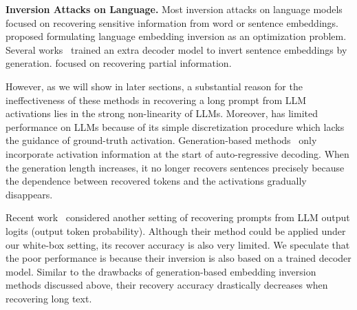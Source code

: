 \noindent \textbf{Inversion Attacks on Language.}
Most inversion attacks on language models focused on recovering sensitive information from word or sentence embeddings.  \cite{song2020information} proposed formulating language embedding inversion as an optimization problem. Several works~\cite{Sentence_inference_attack, Generative-embedding-inversion-attack} trained an extra decoder model to invert sentence embeddings by generation. \cite{pan2020privacy} focused on recovering partial information. 

However, as we will show in later sections, a substantial reason for the ineffectiveness of these methods in recovering a long prompt from LLM activations lies in the strong non-linearity of LLMs. Moreover, \cite{song2020information} has limited performance on LLMs because of its simple discretization procedure which lacks the guidance of ground-truth activation. %
Generation-based methods~\cite{Generative-embedding-inversion-attack,Sentence_inference_attack} only incorporate activation information at the start of auto-regressive decoding. When the generation length increases, it no longer recovers sentences precisely because the dependence between recovered tokens and the activations gradually disappears. 



Recent work~\cite{morris2023language} considered another setting of recovering prompts from LLM output logits (output token probability). %
Although their method could be applied under our white-box setting, its  recover accuracy is also very limited. We speculate that the poor performance is because their inversion is also based on a trained  decoder model. Similar to the drawbacks of generation-based embedding inversion methods discussed above,  their recovery accuracy drastically decreases when recovering long text.  

